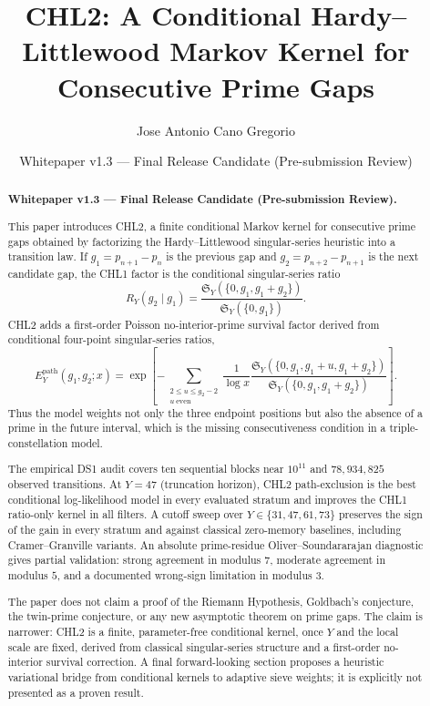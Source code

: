 \documentclass[10pt]{article}
\title{CHL2: A Conditional Hardy--Littlewood Markov Kernel for Consecutive Prime Gaps}
\author{Jose Antonio Cano Gregorio}
\date{Whitepaper v1.3 --- Final Release Candidate (Pre-submission Review)}
\newcommand{\SY}{\mathfrak{S}_Y}
\newcommand{\Epath}{E_Y^{\mathrm{path}}}
\begin{document}
\maketitle
\begin{abstract}
\noindent\textbf{Whitepaper v1.3 --- Final Release Candidate (Pre-submission Review).}\par
This paper introduces CHL2, a finite conditional Markov kernel for consecutive prime gaps obtained by factorizing the Hardy--Littlewood singular-series heuristic into a transition law.  If $g_1=p_{n+1}-p_n$ is the previous gap and $g_2=p_{n+2}-p_{n+1}$ is the next candidate gap, the CHL1 factor is the conditional singular-series ratio
\[
R_Y(g_2\mid g_1)=\frac{\SY(\{0,g_1,g_1+g_2\})}{\SY(\{0,g_1\})}.
\]
CHL2 adds a first-order Poisson no-interior-prime survival factor derived from conditional four-point singular-series ratios,
\[
\Epath(g_1,g_2;x)=\exp\!\left[-\sum_{\substack{2\le u\le g_2-2\\u\ \mathrm{even}}}\frac{1}{\log x}\frac{\SY(\{0,g_1,g_1+u,g_1+g_2\})}{\SY(\{0,g_1,g_1+g_2\})}\right].
\]
Thus the model weights not only the three endpoint positions but also the absence of a prime in the future interval, which is the missing consecutiveness condition in a triple-constellation model.

The empirical DS1 audit covers ten sequential blocks near $10^{11}$ and $78{,}934{,}825$ observed transitions. At $Y=47$ (truncation horizon), CHL2 path-exclusion is the best conditional log-likelihood model in every evaluated stratum and improves the CHL1 ratio-only kernel in all filters. A cutoff sweep over $Y\in\{31,47,61,73\}$ preserves the sign of the gain in every stratum and against classical zero-memory baselines, including Cramer--Granville variants. An absolute prime-residue Oliver--Soundararajan diagnostic gives partial validation: strong agreement in modulus $7$, moderate agreement in modulus $5$, and a documented wrong-sign limitation in modulus $3$.

The paper does not claim a proof of the Riemann Hypothesis, Goldbach's conjecture, the twin-prime conjecture, or any new asymptotic theorem on prime gaps. The claim is narrower: CHL2 is a finite, parameter-free conditional kernel, once $Y$ and the local scale are fixed, derived from classical singular-series structure and a first-order no-interior survival correction. A final forward-looking section proposes a heuristic variational bridge from conditional kernels to adaptive sieve weights; it is explicitly not presented as a proven result.
\end{abstract}
\tableofcontents
\listoffigures
\newpage
\end{document}
